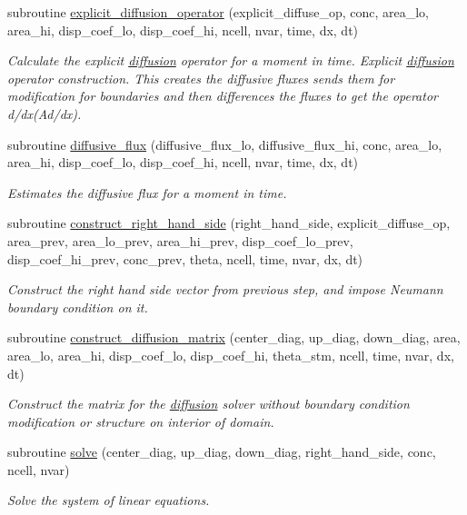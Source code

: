 \begin{CompactItemize}
subroutine \hyperlink{a00056_e421e32336560a2a59008f31316260db}{explicit\_\-diffusion\_\-operator} (explicit\_\-diffuse\_\-op, conc, area\_\-lo, area\_\-hi, disp\_\-coef\_\-lo, disp\_\-coef\_\-hi, ncell, nvar, time, dx, dt)
\begin{CompactList}\small\item\em Calculate the explicit \hyperlink{a00056}{diffusion} operator for a moment in time. Explicit \hyperlink{a00056}{diffusion} operator construction. This creates the diffusive fluxes sends them for modification for boundaries and then differences the fluxes to get the operator d/dx(Ad/dx). \item\end{CompactList}\item 
subroutine \hyperlink{a00056_e86297565f3ce065298d53a286894fa0}{diffusive\_\-flux} (diffusive\_\-flux\_\-lo, diffusive\_\-flux\_\-hi, conc, area\_\-lo, area\_\-hi, disp\_\-coef\_\-lo, disp\_\-coef\_\-hi, ncell, nvar, time, dx, dt)
\begin{CompactList}\small\item\em Estimates the diffusive flux for a moment in time. \item\end{CompactList}\item 
subroutine \hyperlink{a00056_1b9df807b9c9eb3829821221f8933051}{construct\_\-right\_\-hand\_\-side} (right\_\-hand\_\-side, explicit\_\-diffuse\_\-op, area\_\-prev, area\_\-lo\_\-prev, area\_\-hi\_\-prev, disp\_\-coef\_\-lo\_\-prev, disp\_\-coef\_\-hi\_\-prev, conc\_\-prev, theta, ncell, time, nvar, dx, dt)
\begin{CompactList}\small\item\em Construct the right hand side vector from previous step, and impose Neumann boundary condition on it. \item\end{CompactList}\item 
subroutine \hyperlink{a00056_5b532c0d826dac456883290b6350db07}{construct\_\-diffusion\_\-matrix} (center\_\-diag, up\_\-diag, down\_\-diag, area, area\_\-lo, area\_\-hi, disp\_\-coef\_\-lo, disp\_\-coef\_\-hi, theta\_\-stm, ncell, time, nvar, dx, dt)
\begin{CompactList}\small\item\em Construct the matrix for the \hyperlink{a00056}{diffusion} solver without boundary condition modification or structure on interior of domain. \item\end{CompactList}\item 
subroutine \hyperlink{a00056_1fe7c419971f40e38980d90c9b0270b3}{solve} (center\_\-diag, up\_\-diag, down\_\-diag, right\_\-hand\_\-side, conc, ncell, nvar)
\begin{CompactList}\small\item\em Solve the system of linear equations. \item\end{CompactList}\end{CompactItemize}


